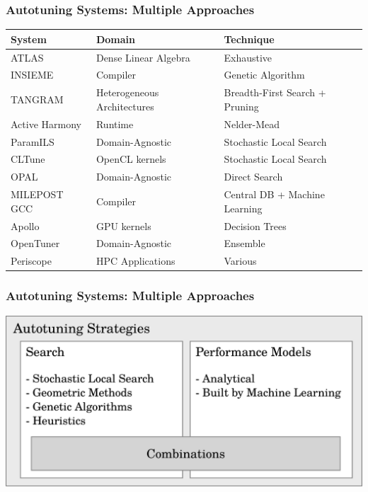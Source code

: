 \documentclass[10pt, compress, aspectratio=169]{beamer}
\begin{document}
\begin{frame}
    \frametitle{Autotuning Systems: Multiple Approaches}
    \begin{table}
        \centering
        \begin{tabular}{@{}lll@{}}
            \toprule
            System & Domain & \alert{Technique} \\ \midrule
            ATLAS & Dense Linear Algebra & Exhaustive \\ \addlinespace
            INSIEME & Compiler & Genetic Algorithm \\
            TANGRAM & Heterogeneous Architectures & Breadth-First Search + Pruning \\
            Active Harmony & Runtime & Nelder-Mead \\
            ParamILS & \alert{Domain-Agnostic} & Stochastic Local Search \\
            CLTune & OpenCL kernels & Stochastic Local Search\\
            OPAL & \alert{Domain-Agnostic} & Direct Search \\ \addlinespace
            MILEPOST GCC & Compiler & Central DB + Machine Learning \\
            Apollo & GPU kernels & Decision Trees \\ \addlinespace
            \alert{OpenTuner} & \alert{Domain-Agnostic} & Ensemble \\
            Periscope & HPC Applications & Various \\
            \bottomrule
        \end{tabular}
    \end{table}
\end{frame}

\begin{frame}
    \frametitle{Autotuning Systems: Multiple Approaches}
    \begin{center}
        \includegraphics[width=.6\textwidth]{autotuning_strategies}
    \end{center}
\end{frame}
\end{document}
